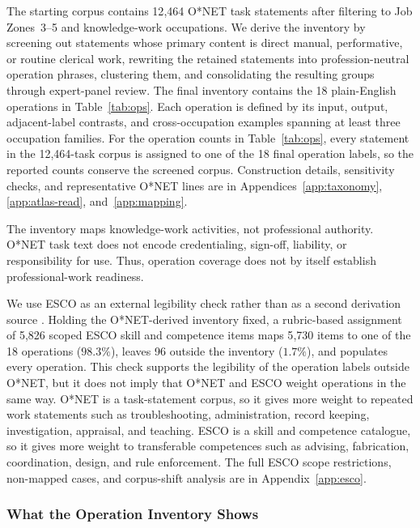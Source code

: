 \documentclass{article}
\begin{document}
The starting corpus contains 12{,}464 O{*}NET task statements after filtering to Job Zones~3--5 and knowledge-work occupations.
We derive the inventory by screening out statements whose primary content is direct manual, performative, or routine clerical work, rewriting the retained statements into profession-neutral operation phrases, clustering them, and consolidating the resulting groups through expert-panel review.
The final inventory contains the 18 plain-English operations in Table~\ref{tab:ops}.
Each operation is defined by its input, output, adjacent-label contrasts, and cross-occupation examples spanning at least three occupation families.
For the operation counts in Table~\ref{tab:ops}, every statement in the 12{,}464-task corpus is assigned to one of the 18 final operation labels, so the reported counts conserve the screened corpus.
Construction details, sensitivity checks, and representative O{*}NET lines are in Appendices~\ref{app:taxonomy}, \ref{app:atlas-read}, and~\ref{app:mapping}.

The inventory maps knowledge-work activities, not professional authority.
O{*}NET task text does not encode credentialing, sign-off, liability, or responsibility for use.
Thus, operation coverage does not by itself establish professional-work readiness.

\label{sec:coverage-esco}
We use ESCO as an external legibility check rather than as a second derivation source \citep{esco2022v111}.
Holding the O{*}NET-derived inventory fixed, a rubric-based assignment of 5{,}826 scoped ESCO skill and competence items maps 5{,}730 items to one of the 18 operations ($98.3\%$), leaves 96 outside the inventory ($1.7\%$), and populates every operation.
This check supports the legibility of the operation labels outside O{*}NET, but it does not imply that O{*}NET and ESCO weight operations in the same way.
O{*}NET is a task-statement corpus, so it gives more weight to repeated work statements such as troubleshooting, administration, record keeping, investigation, appraisal, and teaching.
ESCO is a skill and competence catalogue, so it gives more weight to transferable competences such as advising, fabrication, coordination, design, and rule enforcement.
The full ESCO scope restrictions, non-mapped cases, and corpus-shift analysis are in Appendix~\ref{app:esco}.

\subsubsection{What the Operation Inventory Shows}\label{sec:coverage-shape}
\end{document}
